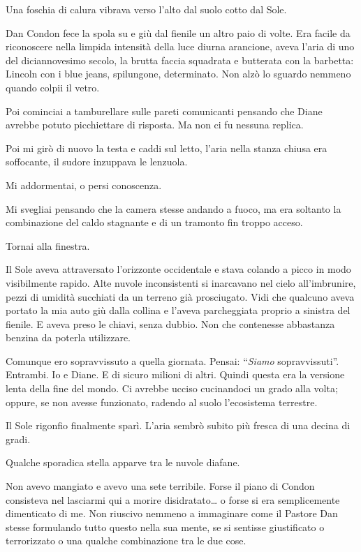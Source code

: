 Una foschia di calura vibrava verso l'alto dal suolo cotto dal Sole.

Dan Condon fece la spola su e giù dal fienile un altro paio di volte.
Era facile da riconoscere nella limpida intensità della luce diurna
arancione, aveva l'aria di uno del diciannovesimo secolo, la brutta
faccia squadrata e butterata con la barbetta: Lincoln con i blue jeans,
spilungone, determinato. Non alzò lo sguardo nemmeno quando colpii il
vetro.

Poi cominciai a tamburellare sulle pareti comunicanti pensando che Diane
avrebbe potuto picchiettare di risposta. Ma non ci fu nessuna replica.

Poi mi girò di nuovo la testa e caddi sul letto, l'aria nella stanza
chiusa era soffocante, il sudore inzuppava le lenzuola.

Mi addormentai, o persi conoscenza.

\separatorefiori

Mi svegliai pensando che la camera stesse andando a fuoco, ma era
soltanto la combinazione del caldo stagnante e di un tramonto fin troppo
acceso.

Tornai alla finestra.

Il Sole aveva attraversato l'orizzonte occidentale e stava colando a
picco in modo visibilmente rapido. Alte nuvole inconsistenti si
inarcavano nel cielo all'imbrunire, pezzi di umidità succhiati da un
terreno già prosciugato. Vidi che qualcuno aveva portato la mia auto giù
dalla collina e l'aveva parcheggiata proprio a sinistra del fienile. E
aveva preso le chiavi, senza dubbio. Non che contenesse abbastanza
benzina da poterla utilizzare.

Comunque ero sopravvissuto a quella giornata. Pensai: ``\emph{Siamo}
sopravvissuti''. Entrambi. Io e Diane. E di sicuro milioni di altri.
Quindi questa era la versione lenta della fine del mondo. Ci avrebbe
ucciso cucinandoci un grado alla volta; oppure, se non avesse
funzionato, radendo al suolo l'ecosistema terrestre.

Il Sole rigonfio finalmente sparì. L'aria sembrò subito più fresca di
una decina di gradi.

Qualche sporadica stella apparve tra le nuvole diafane.

Non avevo mangiato e avevo una sete terribile. Forse il piano di Condon
consisteva nel lasciarmi qui a morire disidratato\ldots{} o forse si era
semplicemente dimenticato di me. Non riuscivo nemmeno a immaginare come
il Pastore Dan stesse formulando tutto questo nella sua mente, se si
sentisse giustificato o terrorizzato o una qualche combinazione tra le
due cose.

